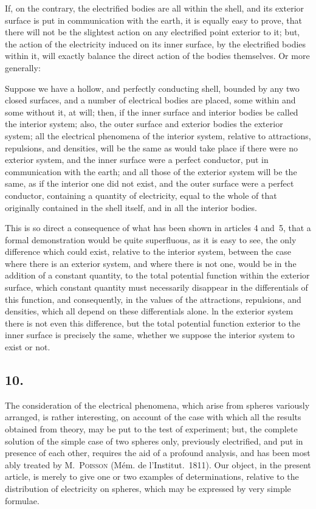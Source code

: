 \documentclass[12pt,notitlepage]{amsart}
\let\Person\textsc
\newcommand\Section[1]{\subsection{{#1}}}
\begin{document}
If, on the contrary, the electrified bodies are all within the shell, and
its exterior surface is put in communication with the earth, it is equally easy
to prove, that there will not be the slightest action on any electrified point
exterior to it; but, the action of the electricity induced on its inner surface,
by the electrified bodies within it, will exactly balance the direct action of
the bodies themselves. Or more generally:

Suppose we have a hollow, and perfectly conducting shell, bounded by any
two closed surfaces,
and a number of electrical bodies are placed, some within and
some without it, at will;
then, if the inner surface and interior bodies be called
the interior system; also, the outer surface and exterior bodies the exterior
system;
all the electrical phenomena of the interior system, relative to attractions,
repulsions, and densities, will be the same as would take place if there were
no exterior system, and the inner surface were a perfect conductor, put in
communication with the earth; and all those of the exterior system will be
the same, as if the interior one did not exist, and the outer surface were a
perfect conductor, containing a quantity of electricity, equal to the whole of
that originally contained in the shell itself, and in all the interior bodies.

This is so direct a consequence of what has been shown in articles
4 and~5, that a formal demonstration would be quite superfluous, as it is easy
to see, the only difference which could exist, relative to the interior system,
between the case where there is an exterior system, and where there is not
one, would be in the addition of a constant quantity, to the total potential
function within the exterior surface, which constant quantity must necessarily
disappear in the differentials of this function, and consequently, in the values
of the attractions, repulsions, and densities, which all depend on these 
differentials alone.
ln the exterior system there is not even this difference, but
the total potential function
exterior to the inner surface is precisely the same,
whether we suppose the interior system to exist or not.
\bigskip

\Section{10.}
The consideration of the electrical phenomena, which arise from spheres
variously arranged, is rather interesting, on account of the case with which
all the results obtained from theory, may be put to the test of experiment;
but, the complete solution of the simple case of two spheres only, previously
electrified, and put in presence of each other, requires the aid of a profound
analysis, and has been most ably treated by M.~\Person{Poisson}
(M\'em. de l'Institut.~1811).
Our object, in the present article, is merely to give one or two examples of
determinations,
relative to the distribution of electricity on spheres, which may
be expressed by very simple formulae.
\end{document}
